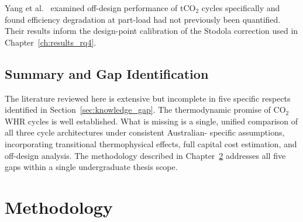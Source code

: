 \documentclass[12pt,a4paper]{report}
\begin{document}
Yang et al.~\cite{Yang2024} examined off-design performance of tCO$_2$
cycles specifically and found efficiency degradation at part-load had not
previously been quantified. Their results inform the design-point calibration
of the Stodola correction used in Chapter~\ref{ch:results_rq4}.

\section{Summary and Gap Identification}
\label{sec:lit_summary}

The literature reviewed here is extensive but incomplete in five specific
respects identified in Section~\ref{sec:knowledge_gap}. The thermodynamic
promise of CO$_2$ WHR cycles is well established. What is missing is a single,
unified comparison of all three cycle architectures under consistent Australian-
specific assumptions, incorporating transitional thermophysical effects, full
capital cost estimation, and off-design analysis. The methodology described in
Chapter~\ref{ch:method} addresses all five gaps within a single undergraduate
thesis scope.
\chapter{Methodology}
\label{ch:method}
\end{document}
